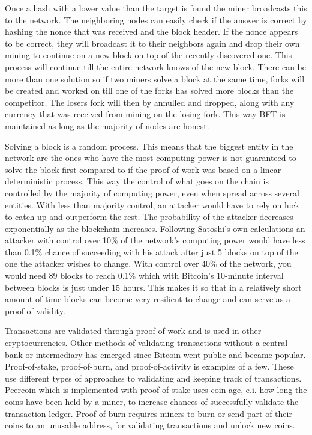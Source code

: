 \documentclass[12pt]{article}
\begin{document}
Once a hash with a lower value than the target is found the miner broadcasts this to the network. The neighboring nodes can easily check if the answer is correct by hashing the nonce that was received and the block header. If the nonce appears to be correct, they will broadcast it to their neighbors again and drop their own mining to continue on a new block on top of the recently discovered one. This process will continue till the entire network knows of the new block. There can be more than one solution so if two miners solve a block at the same time, forks will be created and worked on till one of the forks has solved more blocks than the competitor. The losers fork will then by annulled and dropped, along with any currency that was received from mining on the losing fork. This way BFT is maintained as long as the majority of nodes are honest.

Solving a block is a random process. This means that the biggest entity in the network are the ones who have the most computing power is not guaranteed to solve the block first compared to if the proof-of-work was based on a linear deterministic process. This way the control of what goes on the chain is controlled by the majority of computing power, even when spread across several entities. With less than majority control, an attacker would have to rely on luck to catch up and outperform the rest. The probability of the attacker decreases exponentially as the blockchain increases. Following Satoshi's own calculations\cite{nakamoto2009bitcoin} an attacker with control over 10\% of the network's computing power would have less than 0.1\% chance of succeeding with his attack after just 5 blocks on top of the one the attacker wishes to change. With control over 40\% of the network, you would need 89 blocks to reach 0.1\% which with Bitcoin's 10-minute interval between blocks is just under 15 hours. This makes it so that in a relatively short amount of time blocks can become very resilient to change and can serve as a proof of validity.

Transactions are validated through proof-of-work and is used in other cryptocurrencies. Other methods of validating transactions without a central bank or intermediary has emerged since Bitcoin went public and became popular. Proof-of-stake, proof-of-burn, and proof-of-activity is examples of a few. These use different types of approaches to validating and keeping track of transactions. Peercoin which is implemented with proof-of-stake uses coin age, e.i. how long the coins have been held by a miner, to increase chances of successfully validate the transaction ledger. Proof-of-burn requires miners to burn or send part of their coins to an unusable address, for validating transactions and unlock new coins. 
\end{document}
